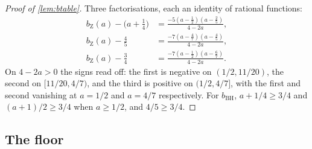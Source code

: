 \documentclass[11pt]{amsart}
\theoremstyle{definition}
\theoremstyle{remark}
\begin{document}
\begin{proof}[Proof of \cref{lem:btable}]
Three factorisations, each an identity of rational functions:
\begin{align*}
  b_{\mathrm Z}(a) - \bigl(a + \tfrac14\bigr) &= \frac{-5(a - \frac12)(a - \frac25)}{4 - 2a}, \\
  b_{\mathrm Z}(a) - \tfrac45 &= \frac{-7(a - \frac47)(a - \frac45)}{4 - 2a}, \\
  b_{\mathrm Z}(a) - \tfrac34 &= \frac{-7(a - \frac12)(a - \frac67)}{4 - 2a} .
\end{align*}
On $4 - 2a > 0$ the signs read off: the first is negative on $(1/2, 11/20)$, the second on $[11/20, 4/7)$, and the third is positive on $(1/2, 4/7]$, with the first and second vanishing at $a = 1/2$ and $a = 4/7$ respectively. For $b_{\mathrm{BH}}$, $a + 1/4 \ge 3/4$ and $(a+1)/2 \ge 3/4$ when $a \ge 1/2$, and $4/5 \ge 3/4$.
\end{proof}

\subsection*{The floor}
\end{document}

